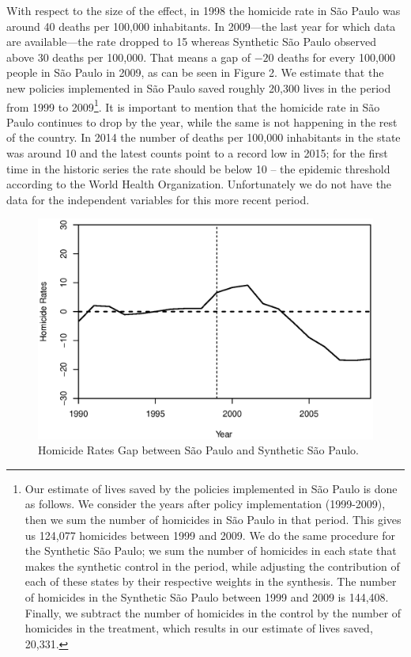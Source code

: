 \documentclass[a4paper,11pt]{article}
\begin{document}
With respect to the size of the effect, in 1998 the homicide rate in S\~{a}o Paulo was around 40 deaths per 100,000 inhabitants. In 2009---the last year for which data are available---the rate dropped to 15 whereas Synthetic S\~{a}o Paulo observed above 30 deaths per 100,000. That means a gap of $-20$ deaths for every 100,000 people in S\~{a}o Paulo in 2009, as can be seen in Figure 2. We estimate that the new policies implemented in S\~{a}o Paulo saved roughly 20,300 lives in the period from 1999 to 2009\footnote{Our estimate of lives saved by the policies implemented in S\~{a}o Paulo is done as follows. We consider the years after policy implementation (1999-2009), then we sum the number of homicides in S\~{a}o Paulo in that period. This gives us 124,077 homicides between 1999 and 2009. We do the same procedure for the Synthetic S\~{a}o Paulo; we sum the number of homicides in each state that makes the synthetic control in the period, while adjusting the contribution of each of these states by their respective weights in the synthesis. The number of homicides in the Synthetic S\~{a}o Paulo between 1999 and 2009 is 144,408. Finally, we subtract the number of homicides in the control by the number of homicides in the treatment, which results in our estimate of lives saved, 20,331.}. It is important to mention that the homicide rate in S\~{a}o Paulo continues to drop by the year, while the same is not happening in the rest of the country. In 2014 the number of deaths per 100,000 inhabitants in the state was around 10 and the latest counts point to a record low in 2015; for the first time in the historic series the rate should be below 10 -- the epidemic threshold according to the World Health Organization. Unfortunately we do not have the data for the independent variables for this more recent period.

\begin{figure}[htp!]
\begin{center}
\centerline{\includegraphics[width=.6\textwidth]{gaps.eps}}
\caption{Homicide Rates Gap between S\~{a}o Paulo and Synthetic S\~{a}o Paulo.}\label{gaps}
\end{center}
\end{figure}
\end{document}
